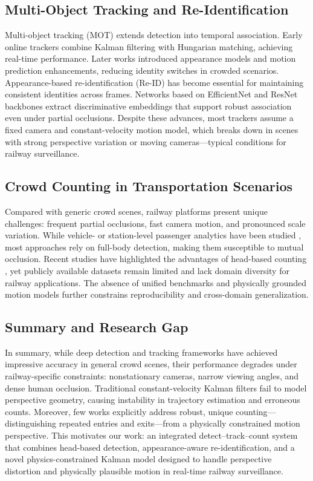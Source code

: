 \subsection{Multi-Object Tracking and Re-Identification}
Multi-object tracking (MOT) extends detection into temporal association. Early online trackers combine Kalman filtering with Hungarian matching, achieving real-time performance\cite{220}. Later works introduced appearance models and motion prediction enhancements, reducing identity switches in crowded scenarios\cite{211}. Appearance-based re-identification (Re-ID) has become essential for maintaining consistent identities across frames\cite{221_OccludedPersonReIdentification_ning2023}. Networks based on EfficientNet and ResNet backbones extract discriminative embeddings that support robust association even under partial occlusions\cite{222,223_Luo_2020}. Despite these advances, most trackers assume a fixed camera and constant-velocity motion model, which breaks down in scenes with strong perspective variation or moving cameras—typical conditions for railway surveillance.

\subsection{Crowd Counting in Transportation Scenarios}
Compared with generic crowd scenes, railway platforms present unique challenges: frequent partial occlusions, fast camera motion, and pronounced scale variation. While vehicle- or station-level passenger analytics have been studied \cite{di_gennaro_hum-card_2024,OpenSensorDataforRail2023}, most approaches rely on full-body detection, making them susceptible to mutual occlusion.  
Recent studies have highlighted the advantages of head-based counting \cite{shao2018crowdhuman}, yet publicly available datasets remain limited and lack domain diversity for railway applications. The absence of unified benchmarks and physically grounded motion models further constrains reproducibility and cross-domain generalization.

\subsection{Summary and Research Gap}
In summary, while deep detection and tracking frameworks have achieved impressive accuracy in general crowd scenes, their performance degrades under railway-specific constraints: nonstationary cameras, narrow viewing angles, and dense human occlusion. Traditional constant-velocity Kalman filters fail to model perspective geometry, causing instability in trajectory estimation and erroneous counts. Moreover, few works explicitly address robust, unique counting—distinguishing repeated entries and exits—from a physically constrained motion perspective.  
This motivates our work: an integrated detect–track–count system that combines head-based detection, appearance-aware re-identification, and a novel physics-constrained Kalman model designed to handle perspective distortion and physically plausible motion in real-time railway surveillance.


